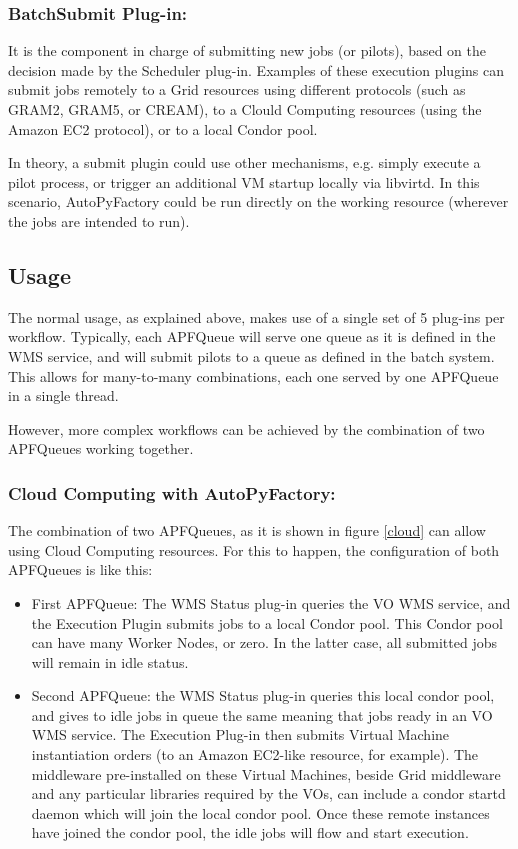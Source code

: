\documentclass[a4paper]{jpconf}
\begin{document}
\subsubsection{BatchSubmit Plug-in:}
It is the component in charge of submitting new jobs (or pilots), 
based on the decision made by the Scheduler plug-in. 
Examples of these execution plugins can submit jobs remotely to a Grid resources using different protocols 
(such as GRAM2, GRAM5, or CREAM), to a Clould Computing resources (using the
Amazon EC2 protocol), or to a local Condor pool. 

In theory, a submit plugin
could use other mechanisms, e.g. simply execute a pilot process, or trigger an
additional VM startup locally via libvirtd. In this scenario, AutoPyFactory could be run
directly on the working resource (wherever the jobs are intended to run).


\subsection{Usage}

The normal usage, as explained above, 
makes use of a single set of 5 plug-ins per workflow. 
Typically, each APFQueue will serve one queue as it is defined in the WMS service, 
and will submit pilots to a queue as defined in the batch system. 
This allows for many-to-many combinations, each one served by one APFQueue in a single thread. 

However, more complex workflows can be achieved by the combination of two APFQueues working together.

\subsubsection{Cloud Computing with AutoPyFactory:}
The combination of two APFQueues, 
as it is shown in figure \ref{cloud}
can allow using Cloud Computing resources. 
For this to happen, the configuration of both APFQueues is like this:

\begin{itemize}
\item First APFQueue: 
The WMS Status plug-in queries the VO WMS service, and the Execution Plugin
submits jobs  to a local Condor pool.
This Condor pool can have many Worker Nodes, or zero. 
In the latter case, all submitted jobs will remain in idle status. 
\item Second APFQueue: 
the WMS Status plug-in queries this local condor pool, 
and gives to idle jobs in queue the same meaning that jobs ready in an VO WMS service. 
The Execution Plug-in then submits Virtual Machine instantiation orders (to an Amazon EC2-like resource, for example). 
The middleware pre-installed on these Virtual Machines, 
beside Grid middleware and any particular libraries required by the VOs, 
can include a condor startd daemon which will join the local condor pool. 
Once these remote instances have joined the condor pool, 
the idle jobs will flow and start execution. 
\end{itemize}
\end{document}
